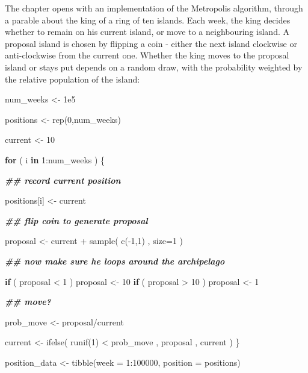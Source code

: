 \documentclass[
]{book}
\newenvironment{Shaded}{\begin{snugshade}}{\end{snugshade}}
\newcommand{\AttributeTok}[1]{\textcolor[rgb]{0.77,0.63,0.00}{#1}}
\newcommand{\ControlFlowTok}[1]{\textcolor[rgb]{0.13,0.29,0.53}{\textbf{#1}}}
\newcommand{\DecValTok}[1]{\textcolor[rgb]{0.00,0.00,0.81}{#1}}
\newcommand{\DocumentationTok}[1]{\textcolor[rgb]{0.56,0.35,0.01}{\textbf{\textit{#1}}}}
\newcommand{\FloatTok}[1]{\textcolor[rgb]{0.00,0.00,0.81}{#1}}
\newcommand{\FunctionTok}[1]{\textcolor[rgb]{0.00,0.00,0.00}{#1}}
\newcommand{\NormalTok}[1]{#1}
\newcommand{\OtherTok}[1]{\textcolor[rgb]{0.56,0.35,0.01}{#1}}
\newcommand{\SpecialCharTok}[1]{\textcolor[rgb]{0.00,0.00,0.00}{#1}}
\begin{document}
The chapter opens with an implementation of the Metropolis algorithm, through a parable about the king of a ring of ten islands. Each week, the king decides whether to remain on his current island, or move to a neighbouring island. A proposal island is chosen by flipping a coin - either the next island clockwise or anti-clockwise from the current one. Whether the king moves to the proposal island or stays put depends on a random draw, with the probability weighted by the relative population of the island:

\begin{Shaded}
\begin{Highlighting}[]
\NormalTok{num\_weeks }\OtherTok{\textless{}{-}} \FloatTok{1e5} 

\NormalTok{positions }\OtherTok{\textless{}{-}} \FunctionTok{rep}\NormalTok{(}\DecValTok{0}\NormalTok{,num\_weeks) }

\NormalTok{current }\OtherTok{\textless{}{-}} \DecValTok{10} 

\ControlFlowTok{for}\NormalTok{ ( i }\ControlFlowTok{in} \DecValTok{1}\SpecialCharTok{:}\NormalTok{num\_weeks ) \{ }
  
  \DocumentationTok{\#\# record current position }
  
\NormalTok{  positions[i] }\OtherTok{\textless{}{-}}\NormalTok{ current}
  
  \DocumentationTok{\#\# flip coin to generate proposal }
  
\NormalTok{  proposal }\OtherTok{\textless{}{-}}\NormalTok{ current }\SpecialCharTok{+} \FunctionTok{sample}\NormalTok{( }\FunctionTok{c}\NormalTok{(}\SpecialCharTok{{-}}\DecValTok{1}\NormalTok{,}\DecValTok{1}\NormalTok{) , }\AttributeTok{size=}\DecValTok{1}\NormalTok{ )}
  
  \DocumentationTok{\#\# now make sure he loops around the archipelago }
  
  \ControlFlowTok{if}\NormalTok{ ( proposal }\SpecialCharTok{\textless{}} \DecValTok{1}\NormalTok{ ) proposal }\OtherTok{\textless{}{-}} \DecValTok{10} 
  \ControlFlowTok{if}\NormalTok{ ( proposal }\SpecialCharTok{\textgreater{}} \DecValTok{10}\NormalTok{ ) proposal }\OtherTok{\textless{}{-}} \DecValTok{1}

  \DocumentationTok{\#\# move?}

\NormalTok{  prob\_move }\OtherTok{\textless{}{-}}\NormalTok{ proposal}\SpecialCharTok{/}\NormalTok{current }

\NormalTok{  current }\OtherTok{\textless{}{-}} \FunctionTok{ifelse}\NormalTok{( }\FunctionTok{runif}\NormalTok{(}\DecValTok{1}\NormalTok{) }\SpecialCharTok{\textless{}}\NormalTok{ prob\_move , proposal , current )}
\NormalTok{\}}

\NormalTok{position\_data }\OtherTok{\textless{}{-}} \FunctionTok{tibble}\NormalTok{(}\AttributeTok{week =} \DecValTok{1}\SpecialCharTok{:}\DecValTok{100000}\NormalTok{, }\AttributeTok{position =}\NormalTok{ positions)}
\end{Highlighting}
\end{Shaded}
\end{document}
